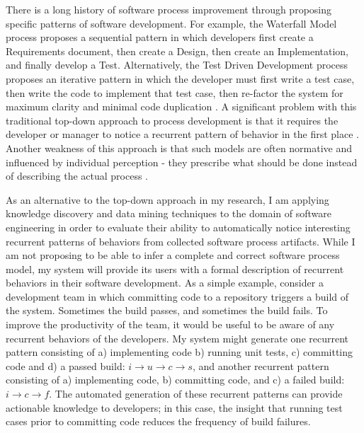 \documentclass{sig-alternate}
\begin{document}
There is a long history of software process improvement through proposing specific patterns of software development. For example, the Waterfall Model process proposes a sequential pattern in which developers first create a Requirements document, then create a Design, then create an Implementation, and finally develop a Test. Alternatively, the Test Driven Development process proposes an iterative pattern in which the developer must first write a test case, then write the code to implement that test case, then re-factor the system for maximum clarity and minimal code duplication \cite{citeulike:2703162}. A significant problem with this traditional top-down approach to process development is that it requires the developer or manager to notice a recurrent pattern of behavior in the first place \cite{citeulike:5043104}. Another weakness of this approach is that such models are often normative and influenced by individual perception - they prescribe what should be done instead of describing the actual process \cite{citeulike:2678511}.

As an alternative to the top-down approach in my research, I am applying knowledge discovery and data mining techniques to the domain of software engineering in order to evaluate their ability to automatically notice interesting recurrent patterns of behaviors from collected software process artifacts. While I am not proposing to be able to infer a complete and correct software process model, my system will provide its users with a formal description of recurrent behaviors in their software development. As a simple example, consider a development team in which committing code to a repository triggers a build of the system. Sometimes the build passes, and sometimes the build fails. To improve the productivity of the team, it would be useful to be aware of any recurrent behaviors of the developers. My system might generate one recurrent pattern consisting of a) implementing code b) running unit tests, c) committing code and d) a passed build: $i \rightarrow u \rightarrow c \rightarrow s $, and another recurrent pattern consisting of a) implementing code, b) committing code, and c) a failed build: $i \rightarrow c \rightarrow f $. The automated generation of these recurrent patterns can provide actionable knowledge to developers; in this case, the insight that running test cases prior to committing code reduces the frequency of build failures.
\end{document}
